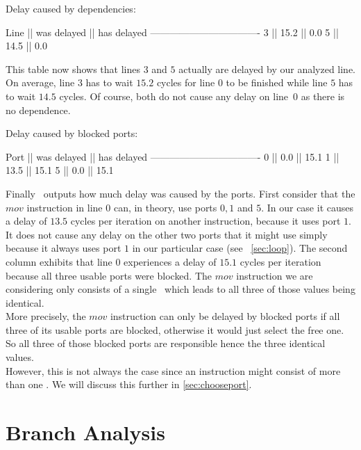 \begin{Example}
Delay caused by dependencies:

Line || was delayed || has delayed
----------------------------------
 3   ||    15.2     ||     0.0
 5   ||    14.5     ||     0.0
\end{Example}

This table now shows that lines $3$ and $5$ actually are delayed by our analyzed line. On average, line $3$ has to wait $15.2$ cycles for line $0$ to be finished while line $5$ has to wait $14.5$ cycles. Of course, both do not cause any delay on line~$0$ as there is no dependence.\\

\begin{Example}
Delay caused by blocked ports:

Port || was delayed || has delayed
----------------------------------
 0   ||     0.0     ||    15.1
 1   ||    13.5     ||    15.1
 5   ||     0.0     ||    15.1
\end{Example}

Finally \suaca\ outputs how much delay was caused by the ports. First consider that the $mov$ instruction in line $0$ can, in theory, use ports $0, 1$ and $5$. In our case it causes a delay of $13.5$ cycles per iteration on another instruction, because it uses port $1$. It does not cause any delay on the other two ports that it might use simply because it always uses port $1$ in our particular case (see ~\autoref{sec:loop}). The second column exhibits that line $0$ experiences a delay of $15.1$ cycles per iteration because all three usable ports were blocked. The $mov$ instruction we are considering only consists of a single \microop\ which leads to all three of those values being identical.\\
More precisely, the $mov$ instruction can only be delayed by blocked ports if all three of its usable ports are blocked, otherwise it would just select the free one. So all three of those blocked ports are responsible hence the three identical values.\\
However, this is not always the case since an instruction might consist of more than one \microop. We will discuss this further in \autoref{sec:chooseport}.




\section{Branch Analysis}

